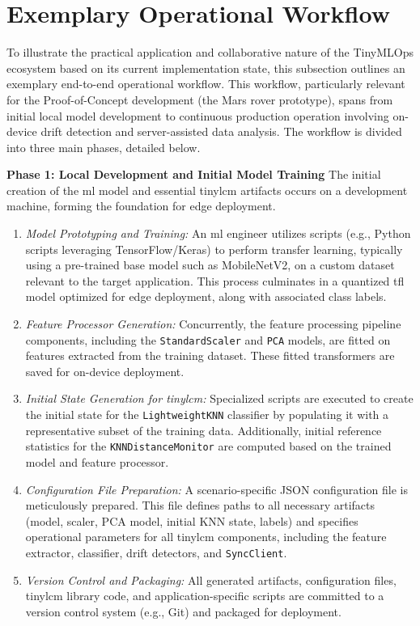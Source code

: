 \section{Exemplary Operational Workflow}
\label{ssec:ecosystem_workflow}

To illustrate the practical application and collaborative nature of the TinyMLOps ecosystem based on its current implementation state, this subsection outlines an exemplary end-to-end operational workflow. This workflow, particularly relevant for the Proof-of-Concept development (the Mars rover prototype), spans from initial local model development to continuous production operation involving on-device drift detection and server-assisted data analysis. The workflow is divided into three main phases, detailed below.

\textbf{Phase 1: Local Development and Initial Model Training}
The initial creation of the \gls{ml} model and essential \gls{tinylcm} artifacts occurs on a development machine, forming the foundation for edge deployment.
\begin{enumerate}
    \item \textit{Model Prototyping and Training:} An \gls{ml} engineer utilizes scripts (e.g., Python scripts leveraging TensorFlow/Keras) to perform transfer learning, typically using a pre-trained base model such as MobileNetV2, on a custom dataset relevant to the target application. This process culminates in a quantized \gls{tfl} model optimized for edge deployment, along with associated class labels.
    \item \textit{Feature Processor Generation:} Concurrently, the feature processing pipeline components, including the \texttt{StandardScaler} and \texttt{PCA} models, are fitted on features extracted from the training dataset. These fitted transformers are saved for on-device deployment.
    \item \textit{Initial State Generation for \gls{tinylcm}:} Specialized scripts are executed to create the initial state for the \texttt{LightweightKNN} classifier by populating it with a representative subset of the training data. Additionally, initial reference statistics for the \texttt{KNNDistanceMonitor} are computed based on the trained model and feature processor.
    \item \textit{Configuration File Preparation:} A scenario-specific JSON configuration file is meticulously prepared. This file defines paths to all necessary artifacts (model, scaler, PCA model, initial KNN state, labels) and specifies operational parameters for all \gls{tinylcm} components, including the feature extractor, classifier, drift detectors, and \texttt{SyncClient}.
    \item \textit{Version Control and Packaging:} All generated artifacts, configuration files, \gls{tinylcm} library code, and application-specific scripts are committed to a version control system (e.g., Git) and packaged for deployment.
\end{enumerate}

